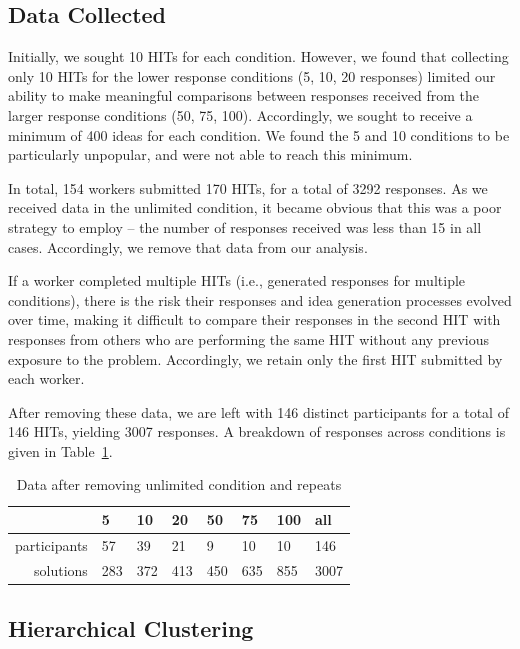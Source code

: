 \subsection{Data Collected}

Initially, we sought 10 HITs for each condition. However, we found that collecting only 10 HITs for the lower response conditions (5, 10, 20 responses) limited our ability to make meaningful comparisons between responses received from the larger response conditions (50, 75, 100). Accordingly, we sought to receive a minimum of 400 ideas for each condition. We found the 5 and 10 conditions to be particularly unpopular, and were not able to reach this minimum.

In total, 154 workers submitted 170 HITs, for a total of 3292 responses. As we received data in the unlimited condition, it became obvious that this was a poor strategy to employ -- the number of responses received was less than 15 in all cases. Accordingly, we remove that data from our analysis.

If a worker completed multiple HITs (i.e., generated responses for multiple conditions), there is the risk their responses and idea generation processes evolved over time, making it difficult to compare their responses in the second HIT with responses from others who are performing the same HIT without any previous exposure to the problem. Accordingly, we retain only the first HIT submitted by each worker.

After removing these data, we are left with 146 distinct participants for a total of 146 HITs, yielding 3007 responses. A breakdown of responses across conditions is given in Table~\ref{tab:data_collected}.

\begin{table}[h!]
\begin{tabular}{r | l l l l l l l }
    & 5 & 10 & 20 & 50 & 75 & 100 & all \\ \hline
    participants & 57 & 39 & 21 & 9 & 10 & 10 & 146 \\
    solutions & 283 & 372 & 413 & 450 & 635 & 855 & 3007
\end{tabular}
\caption{Data after removing unlimited condition and repeats}
\label{tab:data_collected}
\end{table}


\subsection{Hierarchical Clustering}

